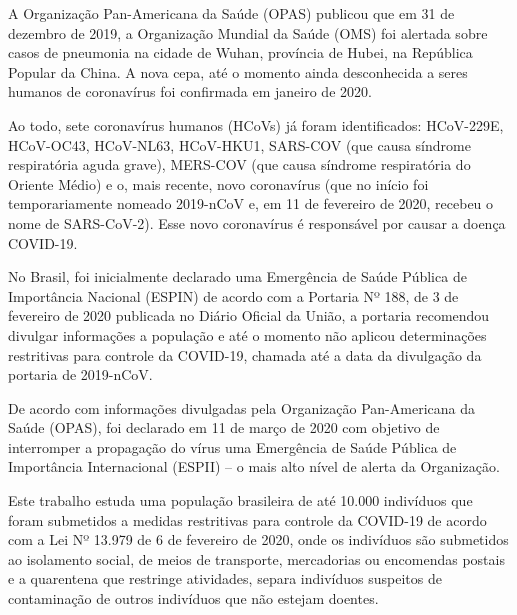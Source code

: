 A Organização Pan-Americana da Saúde (OPAS) publicou que em 31 de dezembro de 2019, a Organização Mundial da Saúde (OMS) foi alertada sobre casos de pneumonia na cidade de Wuhan, província de Hubei, na República Popular da China. A nova cepa, até o momento ainda desconhecida a seres humanos de coronavírus foi confirmada em janeiro de 2020.

Ao todo, sete coronavírus humanos (HCoVs) já foram identificados: HCoV-229E, HCoV-OC43, HCoV-NL63, HCoV-HKU1, SARS-COV (que causa síndrome respiratória aguda grave), MERS-COV (que causa síndrome respiratória do Oriente Médio) e o, mais recente, novo coronavírus (que no início foi temporariamente nomeado 2019-nCoV e, em 11 de fevereiro de 2020, recebeu o nome de SARS-CoV-2). Esse novo coronavírus é responsável por causar a doença COVID-19.

No Brasil, foi inicialmente declarado uma Emergência de Saúde Pública de Importância Nacional (ESPIN) de acordo com a Portaria Nº 188, de 3 de fevereiro de 2020 publicada no Diário Oficial da União, a portaria recomendou divulgar informações a população e até o momento não aplicou determinações restritivas para controle da COVID-19, chamada até a data da divulgação da portaria de  2019-nCoV.

De acordo com informações divulgadas pela Organização Pan-Americana da Saúde (OPAS), foi declarado em 11 de março de 2020 com objetivo de interromper a propagação do vírus uma Emergência de Saúde Pública de Importância Internacional (ESPII) – o mais alto nível de alerta da Organização.  

Este trabalho estuda uma população brasileira de até 10.000 indivíduos que foram submetidos a medidas restritivas para controle da COVID-19 de acordo com a Lei Nº 13.979 de 6 de fevereiro de 2020, onde os indivíduos são submetidos ao isolamento social, de meios de transporte, mercadorias ou encomendas postais e a quarentena que restringe atividades, separa indivíduos suspeitos de contaminação de outros indivíduos que não estejam doentes.












